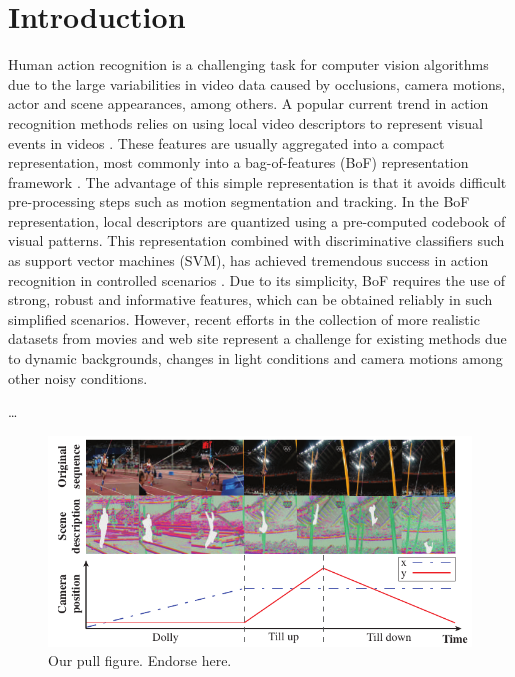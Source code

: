 \section{Introduction}
\label{introduction}

Human action recognition is a challenging task for computer vision algorithms due to the large variabilities in video data caused by occlusions, camera motions, actor and scene appearances, among others. A popular current trend in action recognition methods relies on using local video descriptors to represent visual events in videos \cite{laptev2005, dollar2005, wang2011}. These features are usually aggregated into a compact representation, most commonly into a bag-of-features (BoF) representation framework \cite{laptev2008}. The advantage of this simple representation is that it avoids difficult pre-processing steps such as motion segmentation and tracking. In the BoF representation, local descriptors are quantized using a pre-computed codebook of visual patterns. This representation combined with discriminative classifiers such as support vector machines (SVM), has achieved tremendous success in action recognition in controlled scenarios \cite{blank2005, schuldt2004}. Due to its simplicity, BoF requires the use of strong, robust and informative features, which can be  obtained reliably in such simplified scenarios. However, recent efforts in the collection of more realistic datasets from movies and web site  \cite{kuehne2011,  marszalek2009} represent a challenge for existing methods due to dynamic backgrounds, changes in light  conditions and camera motions among other noisy conditions.

\dots
\begin{figure}[ht]
\begin{center}
\includegraphics[width=0.98\linewidth]{fig/PullFigure.pdf}
\end{center}
\caption{Our pull figure. Endorse here.}
\label{fig:pull_figure}
\end{figure}

